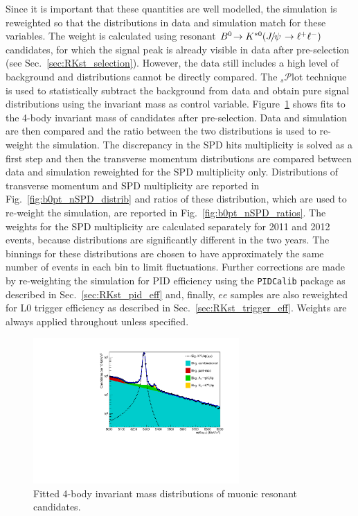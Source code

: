 Since it is important that these quantities are well modelled, the simulation is
reweighted so that the distributions in data and simulation match for these variables.
The weight is calculated using resonant $\decay{\Bz}{\Kstarz(\jpsi\to\ll)}$ candidates, for which the signal peak
is already visible in data after pre-selection (see Sec.~\ref{sec:RKst_selection}). However, the data still includes
a high level of background and distributions cannot be directly compared.
The $_s\mathcal{P}$lot technique~\cite{sPlot} is used to statistically subtract the background from
data and obtain pure signal distributions using the invariant mass as control variable.
Figure~\ref{fig:RKst_sW_mass} shows fits to the 4-body invariant mass of candidates after pre-selection.
Data and simulation are then compared and the ratio between the two distributions is used to re-weight
the simulation. The discrepancy in the SPD hits multiplicity is solved as a first step and then the \Bz transverse momentum 
distributions are compared between data and simulation reweighted for the SPD multiplicity only.
Distributions of \Bz transverse momentum and SPD multiplicity are reported in Fig.~\ref{fig:b0pt_nSPD_distrib}
and ratios of these distribution, which are used to re-weight the simulation, are reported in 
Fig.~\ref{fig:b0pt_nSPD_ratios}. The weights for the SPD multiplicity are calculated
separately for 2011 and 2012 events, because distributions are significantly different
in the two years. The binnings for these distributions are chosen to have approximately 
the same number of events in each bin to limit fluctuations.
Further corrections are made by re-weighting the simulation for PID efficiency using the
\verb!PIDCalib! package as described in Sec.~\ref{sec:RKst_pid_eff} and, finally, 
$ee$ samples are also reweighted for L0 trigger efficiency as described in Sec.~\ref{sec:RKst_trigger_eff}.
Weights are always applied throughout unless specified.

 \begin{figure}[h!]
\centering
\includegraphics[width=0.7\textwidth]{RKst/figs/sW/KstJPsMM_log.pdf}
\caption{Fitted 4-body invariant mass distributions of muonic resonant candidates.}
\label{fig:RKst_sW_mass}
\end{figure}

